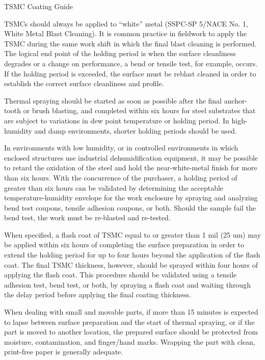 \begin{table}
  \caption{TSMC Coating Guide}
  \label{tab:tsmc-coating-guide}
\end{table}

TSMCs should always be applied to “white” metal (SSPC-SP 5/NACE No. 1, White Metal Blast Cleaning). It is
common practice in fieldwork to apply the TSMC during the same work shift in which the final blast cleaning is
performed. The logical end point of the holding period is when the surface cleanliness degrades or a change on
performance, a bend or tensile test, for example, occurs. If the holding period is exceeded, the surface must be reblast
cleaned in order to establish the correct surface cleanliness and profile.

Thermal spraying should be started as soon as possible after the final anchor-tooth or brush blasting, and
completed within six hours for steel substrates that are subject to variations in dew point temperature or holding
period. In high-humidity and damp environments, shorter holding periods should be used.

In environments with low humidity, or in controlled environments in which enclosed structures use industrial
dehumidification equipment, it may be possible to retard the oxidation of the steel and hold the near-white-metal
finish for more than six hours. With the concurrence of the purchaser, a holding period of greater than six hours can
be validated by determining the acceptable temperature-humidity envelope for the work enclosure by spraying and
analyzing bend test coupons, tensile adhesion coupons, or both. Should the sample fail the bend test, the work must
be re-blasted and re-tested.

When specified, a flash coat of TSMC equal to or greater than 1 mil (25 um) may be applied within six hours of
completing the surface preparation in order to extend the holding period for up to four hours beyond the application
of the flash coat. The final TSMC thickness, however, should be sprayed within four hours of applying the flash
coat. This procedure should be validated using a tensile adhesion test, bend test, or both, by spraying a flash coat and
waiting through the delay period before applying the final coating thickness.

When dealing with small and movable parts, if more than 15 minutes is expected to lapse between surface
preparation and the start of thermal spraying, or if the part is moved to another location, the prepared surface should
be protected from moisture, contamination, and finger/hand marks. Wrapping the part with clean, print-free paper is
generally adequate.

